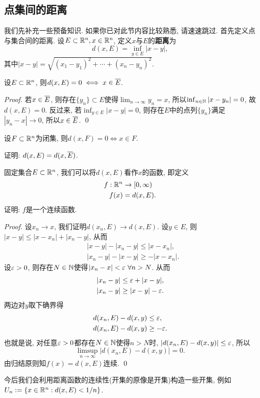 \subsection{点集间的距离}
我们先补充一些预备知识. 如果你已对此节内容比较熟悉, 请速速跳过.
首先定义点与集合间的距离. 设$E \subset \mathbb{R}^n, x \in \mathbb{R}^n$, 定义$x$与$E$的\textbf{距离}为
$$d(x,E) = \inf_{y \in E} |x-y|, $$
其中$|x-y| = \sqrt{(x_1-y_1)^2 + \cdots + (x_n-y_n)^2}$.
\begin{example}
    设$E \subset \mathbb{R}^n$, 则$d(x,E) = 0 \iff x \in \overline{E}$. 
\end{example}
\begin{proof}
    若$x \in \overline{E}$, 则存在$\{y_n\} \subset E$使得$\lim_{n \to \infty}y_n = x$, 所以$\inf_{n \in \mathbb{N}}|x-y_n| = 0$, 故$d(x,E) = 0$. 反过来, 若$\inf_{y \in E}|x-y| = 0$, 则存在$E$中的点列$\{y_n\}$满足$|y_n - x| \to 0$, 所以$x \in \overline{E}$. \qed 
\end{proof}
\begin{exercise}
    设$F \subset \mathbb{R}^n$为闭集, 则$d(x,F) = 0 \iff x \in F$.
\end{exercise}
\begin{exercise}
    证明: $d(x,E) = d(x, \overline{E})$. 
\end{exercise}
\begin{example}
    固定集合$E \subset \mathbb{R}^n$, 我们可以将$d(x,E)$看作$x$的函数, 即定义
    \begin{align*}
        f: \mathbb{R}^n &\to [0,\infty) \\
        f(x) &= d(x,E).
    \end{align*}
    证明: $f$是一个连续函数. 
\end{example}
\begin{proof}
    设$x_n \to x$, 我们证明$d(x_n,E) \to d(x,E)$. 设$y \in E$, 则$|x-y| \leq |x-x_n| + |x_n-y|$, 从而
    \begin{align*}
        &|x-y|-|x_n-y| \leq |x-x_n|, \\
        &|x_n-y| - |x-y| \geq -|x-x_n|.
    \end{align*}
    设$\varepsilon>0$, 则存在$N \in \mathbb{N}$使得$|x_n - x|<\varepsilon~\forall n > N$. 从而
    \begin{align*}
        &|x_n-y| \leq \varepsilon + |x-y|, \\
        &|x_n-y| \geq |x-y|-\varepsilon.
    \end{align*}
    两边对$y$取下确界得
    \begin{align*}
        &d(x_n,E)-d(x,y) \leq \varepsilon, \\
        &d(x_n,E)-d(x,y) \geq -\varepsilon.
    \end{align*}
    也就是说, 对任意$\varepsilon>0$都存在$N\in\mathbb{N}$使得$n>N$时, $|d(x_n,E)-d(x,y)| \leq \varepsilon$, 所以
    $$\limsup_{n\to \infty}|d(x_n,E)-d(x,y)|=0. $$
    由归结原则知$f(x)=d(x,E)$连续. \qed    
\end{proof}
今后我们会利用距离函数的连续性(开集的原像是开集)构造一些开集, 例如$U_n := \{x \in \mathbb{R}^n: d(x,E) < 1/n\}$.

